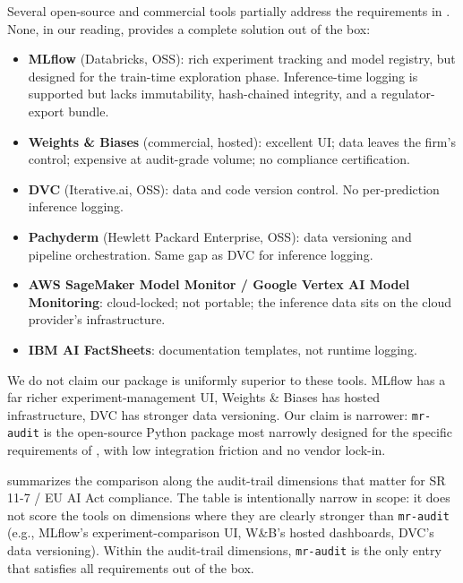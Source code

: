 Several open-source and commercial tools partially address the requirements in . None, in our reading, provides a complete solution out of the box:

\begin{itemize}[leftmargin=*]
    \item \textbf{MLflow} (Databricks, OSS): rich experiment tracking and model registry, but designed for the train-time exploration phase. Inference-time logging is supported but lacks immutability, hash-chained integrity, and a regulator-export bundle.
    \item \textbf{Weights \& Biases} (commercial, hosted): excellent UI; data leaves the firm's control; expensive at audit-grade volume; no compliance certification.
    \item \textbf{DVC} (Iterative.ai, OSS): data and code version control. No per-prediction inference logging.
    \item \textbf{Pachyderm} (Hewlett Packard Enterprise, OSS): data versioning and pipeline orchestration. Same gap as DVC for inference logging.
    \item \textbf{AWS SageMaker Model Monitor / Google Vertex AI Model Monitoring}: cloud-locked; not portable; the inference data sits on the cloud provider's infrastructure.
    \item \textbf{IBM AI FactSheets}: documentation templates, not runtime logging.
\end{itemize}

We do not claim our package is uniformly superior to these tools. MLflow has a far richer experiment-management UI, Weights \& Biases has hosted infrastructure, DVC has stronger data versioning. Our claim is narrower: \texttt{mr-audit} is the open-source Python package most narrowly designed for the specific requirements of , with low integration friction and no vendor lock-in.

 summarizes the comparison along the audit-trail dimensions that matter for SR 11-7 / EU AI Act compliance. The table is intentionally narrow in scope: it does not score the tools on dimensions where they are clearly stronger than \texttt{mr-audit} (e.g., MLflow's experiment-comparison UI, W\&B's hosted dashboards, DVC's data versioning). Within the audit-trail dimensions, \texttt{mr-audit} is the only entry that satisfies all requirements out of the box.

